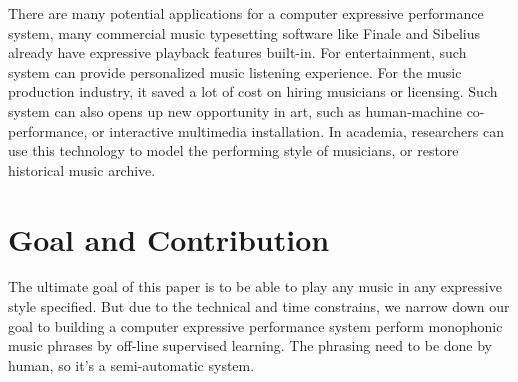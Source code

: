 
There are many potential applications for a computer expressive performance system, many commercial music typesetting software like Finale and Sibelius already have expressive playback features built-in. For entertainment, such system can provide personalized music listening experience. For the music production industry, it saved a lot of cost on hiring musicians or licensing. Such system can also opens up new opportunity in art, such as human-machine co-performance, or interactive multimedia installation. In academia, researchers can use this technology to model the performing style of musicians, or restore historical music archive.


%



\section{Goal and Contribution}
The ultimate goal of this paper is to be able to play any music in any expressive style specified. But due to the technical and time constrains, we narrow down our goal to building a computer expressive performance system perform monophonic music phrases by off-line supervised learning. The phrasing need to be done by human, so it's a semi-automatic system.


